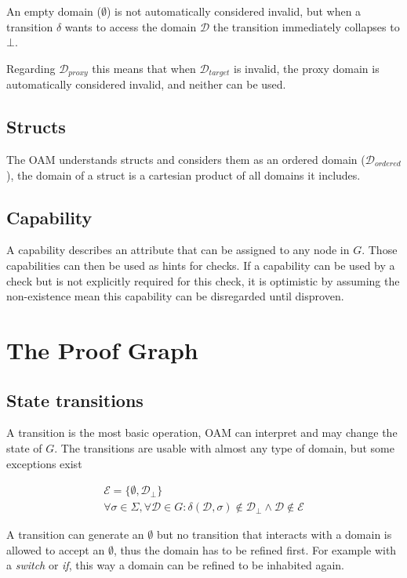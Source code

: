 \documentclass{article}
\begin{document}
    An empty domain ($\emptyset$) is not automatically considered invalid, but when a transition $\delta$ wants to access the domain $\mathcal{D}$ the transition immediately collapses to $\bot$.

    Regarding $\mathcal{D}_{proxy}$ this means that when $\mathcal{D}_{target}$ is invalid, the proxy domain is automatically considered invalid, and neither can be used.

    \subsection{Structs}

    The OAM understands structs and considers them as an ordered domain ($\mathcal{D}_{ordered}$), the domain of a struct is a cartesian product of all domains it includes.

    \subsection{Capability}

    A capability describes an attribute that can be assigned to any node in $G$. Those capabilities can then be used as hints for checks. If a capability can be used by a check but is not explicitly required for this check, it is optimistic by assuming the non-existence mean this capability can be disregarded until disproven.

    \section{The Proof Graph}

    \subsection{State transitions}

    A transition is the most basic operation, OAM can interpret and may change the state of $G$. The transitions are usable with almost any type of domain, but some exceptions exist

    \begin{gather*}
        \mathcal{E}=\{ \emptyset, \mathcal{D}_\bot \} \\
        \forall \sigma \in \Sigma, \forall \mathcal{D} \in G: \delta(\mathcal{D}, \sigma) \notin \mathcal{D}_\bot \land \mathcal{D} \notin \mathcal{E}
    \end{gather*}

    A transition can generate an $\emptyset$ but no transition that interacts with a domain is allowed to accept an $\emptyset$, thus the domain has to be refined first. For example with a \textit{switch} or \textit{if}, this way a domain can be refined to be inhabited again.
\end{document}
